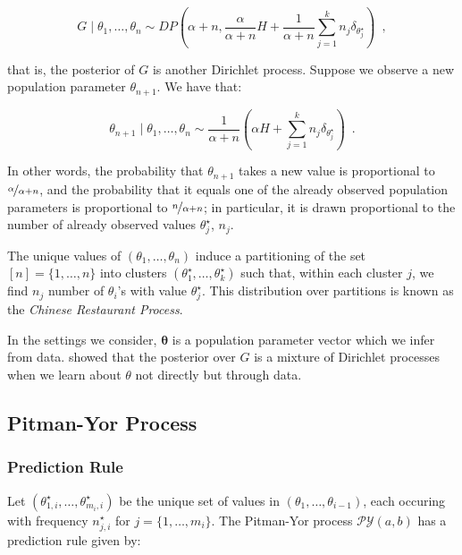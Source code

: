 \documentclass[]{article}
\begin{document}
\begin{equation}
    G \mid \theta_1, \ldots, \theta_n \sim DP\left(\alpha + n, \frac{\alpha}{\alpha + n}H + \frac{1}{\alpha + n} \sum_{j=1}^k n_j \delta_{\theta^{\star}_j}\right) \enspace ,
\end{equation}

that is, the posterior of $G$ is another Dirichlet process. Suppose we observe a new population parameter $\theta_{n + 1}$. We have that:

\begin{equation}
    \theta_{n + 1} \mid \theta_1, \ldots, \theta_n \sim \frac{1}{\alpha + n} \left(\alpha H + \sum_{j=1}^k n_j \delta_{\theta^{\star}_j}\right) \enspace .
\end{equation}

In other words, the probability that $\theta_{n + 1}$ takes a new value is proportional to $\nicefrac{\alpha}{\alpha + n}$, and the probability that it equals one of the already observed population parameters is proportional to $\nicefrac{n}{\alpha + n}$; in particular, it is drawn proportional to the number of already observed values $\theta^{\star}_j$, $n_j$.

The unique values of $(\theta_1, \ldots, \theta_n)$ induce a partitioning of the set $[n] = \{1, \ldots, n\}$ into clusters $(\theta^{\star}_1, \ldots, \theta^{\star}_k)$ such that, within each cluster $j$, we find $n_j$ number of $\theta_i$'s with value $\theta^{\star}_j$. This distribution over partitions is known as the \textit{Chinese Restaurant Process}.

In the settings we consider, $\mathbf{\theta}$ is a population parameter vector which we infer from data. \textcite{antoniak1974mixtures} showed that the posterior over $G$ is a mixture of Dirichlet processes when we learn about $\theta$ not directly but through data.
\color{black}

\subsection{Pitman-Yor Process}
\subsubsection{Prediction Rule}
Let $(\theta^{\star}_{1, i}, \ldots, \theta^{\star}_{m_i, i})$ be the unique set of values in $(\theta_1, \ldots, \theta_{i-1})$, each occuring with frequency $n^{\star}_{j, i}$ for $j = \{1, \ldots, m_i\}$. The Pitman-Yor process $\mathcal{PY}(a, b)$ has a prediction rule given by:
\end{document}
